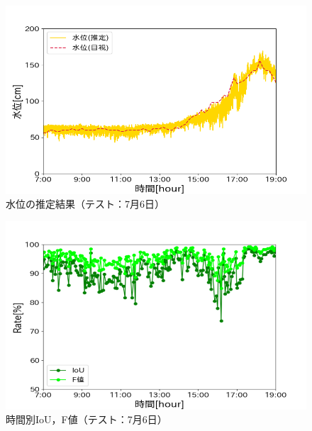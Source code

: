 \begin{figure}[ht] 
  \begin{center}
    \includegraphics[width=\linewidth]{image/0706_kousa.png}
  \end{center}
  \caption{水位の推定結果（テスト：7月6日）}
  \label{kousa_0706}
\end{figure}

\begin{figure}[ht] 
  \begin{center}
    \includegraphics[width=\linewidth]{image/0706_f_IoU.png}
  \end{center}
  \caption{時間別IoU，F値（テスト：7月6日）}
  \label{kousa_IoU_0706}
\end{figure}


